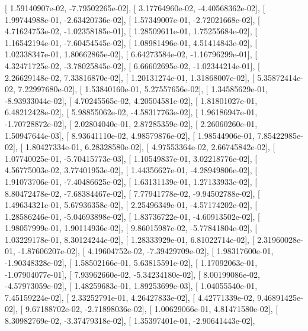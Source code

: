 \documentclass{article}
\begin{document}
       [  1.59140907e-02,  -7.79502265e-02],
       [  3.17764960e-02,  -4.40568362e-02],
       [  1.99744988e-01,  -2.63420736e-02],
       [  1.57349007e-01,  -2.72021668e-02],
       [  4.71624753e-02,  -1.02358185e-01],
       [  1.28509611e-01,   1.75255684e-02],
       [  1.16542194e-01,  -7.60454545e-02],
       [  1.08981496e-01,   4.51414843e-02],
       [  1.02338347e-01,   1.80662865e-02],
       [  6.64273584e-02,  -1.16796299e-01],
       [  4.32471725e-02,  -3.78025845e-02],
       [  6.66602695e-02,  -1.02344214e-01],
       [  2.26629148e-02,   7.33816870e-02],
       [  1.20131274e-01,   1.31868007e-02],
       [  5.35872414e-02,   7.22997680e-02],
       [  1.53840160e-01,   5.27557656e-02],
       [  1.34585629e-01,  -8.93933044e-02],
       [  4.70245565e-02,   4.20504581e-02],
       [  1.81801027e-01,   6.48212428e-02],
       [  5.98855062e-02,  -4.58317763e-02],
       [  1.96186947e-01,  -1.70728872e-02],
       [  2.02804040e-01,   2.87285359e-02],
       [  2.26060260e-01,   1.50947644e-03],
       [  8.93641110e-02,   4.98579876e-02],
       [  1.98544906e-01,   7.85422985e-02],
       [  1.80427334e-01,   6.28328580e-02],
       [  4.97553364e-02,   2.66745842e-02],
       [  1.07740025e-01,  -5.70415773e-03],
       [  1.10549837e-01,   3.02218776e-02],
       [  4.56775003e-02,   3.77401953e-02],
       [  1.44356627e-01,  -4.28949806e-02],
       [  1.91073706e-01,  -7.40486625e-02],
       [  1.63131139e-01,   1.27133933e-02],
       [  8.80472478e-02,  -7.68384467e-02],
       [  7.77941778e-02,  -9.94502788e-02],
       [  1.49634321e-01,   5.67936358e-02],
       [  2.25496349e-01,  -4.57174202e-02],
       [  1.28586246e-01,  -5.04693898e-02],
       [  1.83736722e-01,  -4.60913502e-02],
       [  1.98057999e-01,   1.90114936e-02],
       [  9.86015987e-02,  -5.77841804e-02],
       [  1.03229178e-01,   8.30124244e-02],
       [  1.28333929e-01,   6.81022714e-02],
       [  2.31960028e-01,  -1.87606207e-02],
       [  4.19604752e-02,  -7.39429709e-02],
       [  1.98317600e-01,  -1.90348328e-02],
       [  1.58502166e-01,   5.63815591e-02],
       [  1.17092063e-01,  -1.07904077e-01],
       [  7.93962660e-02,  -5.34234180e-02],
       [  8.00199086e-02,  -4.57973059e-02],
       [  1.48259683e-01,   1.89253699e-03],
       [  1.04055540e-01,   7.45159224e-02],
       [  2.33252791e-01,   4.26427833e-02],
       [  4.42771339e-02,   9.46891425e-02],
       [  9.67188702e-02,  -2.71898036e-02],
       [  1.00629066e-01,   4.81471580e-02],
       [  8.30982769e-02,  -3.37479318e-02],
       [  1.35397401e-01,  -2.90641443e-02],
\end{document}
